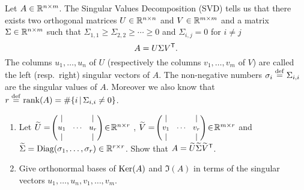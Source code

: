 \documentclass[11pt,nocut]{article}
\begin{document}
\newpage

\begin{problem}[2 points]
	Let $A \in \mathbb{R}^{n \times m}$. The Singular Values Decomposition (SVD) tells us that there exists two orthogonal matrices $U \in \mathbb{R}^{n \times n}$ and $V \in \mathbb{R}^{m \times m}$ and a matrix $\Sigma \in \mathbb{R}^{n \times m}$ such that $\Sigma_{1,1} \geq \Sigma_{2,2}  \geq \cdots \geq 0$ and $\Sigma_{i,j} = 0$ for $i\neq j$
	$$
	A = U \Sigma V^{{\sf T}}.
	$$
	The columns $u_1, \dots, u_n$ of $U$ (respectively the columns $v_1, \dots, v_m$ of $V$) are called the left (resp.\ right) singular vectors of $A$. The non-negative numbers $\sigma_i \overset{\rm def}{=} \Sigma_{i,i}$ are the singular values of $A$. Moreover we also know that $r \overset{\rm def}{=} {{\rm rank}}(A) = \# \{i \, | \, \Sigma_{i,i} \neq 0 \}$.
	\begin{enumerate}[label=\normalfont(\textbf{\alph*})]
		\item Let 
			$\widetilde{U} = \!
			{\small \begin{pmatrix}
					| & & | \\
					u_1 & \!\cdots\! & u_r \\
					| & & | 
			\end{pmatrix} } \! \in \! \mathbb{R}^{n \times r}$ ,
			$\widetilde{V} = \!
			{\small \begin{pmatrix}
					| & & | \\
					v_1 & \!\cdots\! & v_r \\
					| & & | 
			\end{pmatrix} } \! \in \! \mathbb{R}^{m \times r}$ and
			$\widetilde{\Sigma} = {{\rm Diag}}(\sigma_1, \dots, \sigma_r) \in \mathbb{R}^{r \times r}$.
			Show that $A = \widetilde{U}\widetilde{\Sigma}\widetilde{V}^{{\sf T}}$.
		\item Give orthonormal bases of ${{\rm Ker}}(A)$ and $\Im(A)$ in terms of the singular vectors $u_1, \dots, u_n, v_1, \dots , v_m$.
	\end{enumerate}
\end{problem}

\vspace{5mm}
\end{document}
